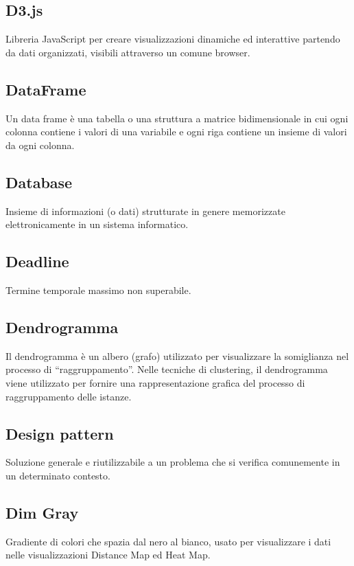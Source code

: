 \documentclass[../glossario.tex]{subfiles}
\begin{document}
    
\subsection*{D3.js}
Libreria JavaScript per creare visualizzazioni dinamiche ed interattive partendo da dati organizzati, visibili attraverso un comune browser.


\subsection*{DataFrame}
Un data frame è una tabella o una struttura a matrice bidimensionale in cui ogni colonna contiene i valori di una variabile e ogni riga contiene un insieme di valori da ogni colonna.


\subsection*{Database}
Insieme di informazioni (o dati) strutturate in genere memorizzate elettronicamente in un sistema informatico.

\subsection*{Deadline}
Termine temporale massimo non superabile.

\subsection*{Dendrogramma}
Il dendrogramma è un albero (grafo) utilizzato per visualizzare la somiglianza nel processo di “raggruppamento”. Nelle tecniche di clustering, il dendrogramma viene utilizzato per fornire una rappresentazione grafica del processo di raggruppamento delle istanze.

\subsection*{Design pattern}
Soluzione generale e riutilizzabile a un problema che si verifica comunemente in un determinato contesto.

\subsection*{Dim Gray}
Gradiente di colori che spazia dal nero al bianco, usato per visualizzare i dati nelle visualizzazioni Distance Map ed Heat Map.
\end{document}

